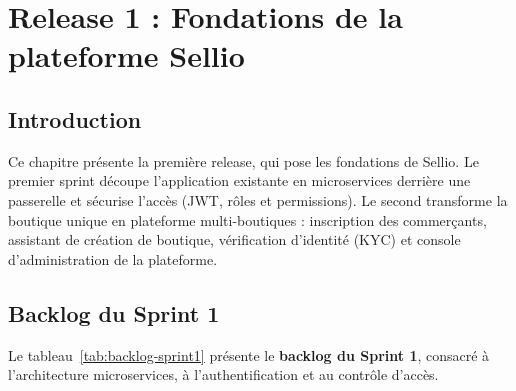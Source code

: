 \thispagestyle{fancy}
\chapter{Release 1 : Fondations de la plateforme Sellio}
\section*{Introduction}
Ce chapitre présente la première release, qui pose les fondations de Sellio. Le premier sprint découpe l'application existante en microservices derrière une passerelle et sécurise l'accès (JWT, rôles et permissions). Le second transforme la boutique unique en plateforme multi-boutiques : inscription des commerçants, assistant de création de boutique, vérification d'identité (KYC) et console d'administration de la plateforme.

\section{Backlog du Sprint 1}
Le tableau~\ref{tab:backlog-sprint1} présente le \textbf{backlog du Sprint 1}, consacré à l'architecture microservices, à l'authentification et au contrôle d'accès.

